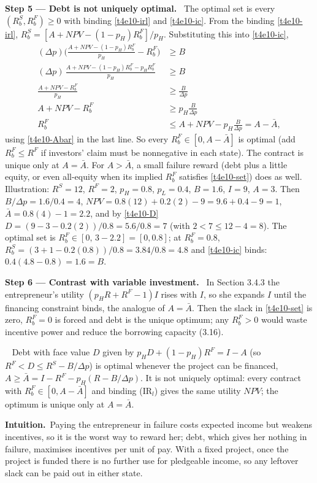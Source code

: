 \documentclass[11pt,a4paper]{article}
\newcommand{\step}[2]{\par\medskip\noindent\textbf{Step #1 --- #2.}~}
\newcommand{\intuition}{\par\medskip\noindent\textbf{Intuition.}~}
\newcommand{\answer}[1]{\par\smallskip\noindent\fbox{\textbf{Answer #1.}}~}
\begin{document}
\step{5}{Debt is not uniquely optimal} The optimal set is every $(R_b^S,R_b^F)\ge0$ with binding
\eqref{t4e10-irl} and \eqref{t4e10-ic}. From the binding \eqref{t4e10-irl},
$R_b^S=[A+\mathit{NPV}-(1-p_H)R_b^F]/p_H$. Substituting this into \eqref{t4e10-ic},
\begin{align}
  (\Delta p)\Big(\frac{A+\mathit{NPV}-(1-p_H)R_b^F}{p_H}-R_b^F\Big) &\ge B \nonumber\\
  (\Delta p)\,\frac{A+\mathit{NPV}-(1-p_H)R_b^F-p_HR_b^F}{p_H} &\ge B \nonumber\\
  \frac{A+\mathit{NPV}-R_b^F}{p_H} &\ge \frac{B}{\Delta p} \nonumber\\
  A+\mathit{NPV}-R_b^F &\ge p_H\frac{B}{\Delta p} \nonumber\\
  R_b^F &\le A+\mathit{NPV}-p_H\frac{B}{\Delta p}=A-\bar A, \label{t4e10-set}
\end{align}
using \eqref{t4e10-Abar} in the last line. So every $R_b^F\in[0,A-\bar A]$ is optimal (add
$R_b^F\le R^F$ if investors' claim must be nonnegative in each state). The contract is unique only
at $A=\bar A$. For $A>\bar A$, a small failure reward (debt plus a little equity, or even all-equity
when its implied $R_b^F$ satisfies \eqref{t4e10-set}) does as well. Illustration: $R^S=12$, $R^F=2$,
$p_H=0.8$, $p_L=0.4$, $B=1.6$, $I=9$, $A=3$. Then $B/\Delta p=1.6/0.4=4$,
$\mathit{NPV}=0.8(12)+0.2(2)-9=9.6+0.4-9=1$, $\bar A=0.8(4)-1=2.2$, and by \eqref{t4e10-D}
$D=(9-3-0.2(2))/0.8=5.6/0.8=7$ (with $2<7\le12-4=8$). The optimal set is
$R_b^F\in[0,\,3-2.2]=[0,0.8]$; at $R_b^F=0.8$, $R_b^S=(3+1-0.2(0.8))/0.8=3.84/0.8=4.8$ and
\eqref{t4e10-ic} binds: $0.4(4.8-0.8)=1.6=B$.

\step{6}{Contrast with variable investment} In Section 3.4.3 the entrepreneur's utility
$(p_HR+R^F-1)I$ rises with $I$, so she expands $I$ until the financing constraint binds, the
analogue of $A=\bar A$. Then the slack in \eqref{t4e10-set} is zero, $R_b^F=0$ is forced and debt is
the unique optimum; any $R_b^F>0$ would waste incentive power and reduce the borrowing capacity (3.16).

\answer{(3.18)} Debt with face value $D$ given by $p_HD+(1-p_H)R^F=I-A$ (so $R^F<D\le R^S-B/\Delta p$)
is optimal whenever the project can be financed, $A\ge\bar A=I-R^F-p_H(R-B/\Delta p)$. It is not
uniquely optimal: every contract with $R_b^F\in[0,A-\bar A]$ and binding (IR$_l$) gives the same
utility $\mathit{NPV}$; the optimum is unique only at $A=\bar A$.

\intuition Paying the entrepreneur in failure costs expected income but weakens incentives, so it is
the worst way to reward her; debt, which gives her nothing in failure, maximises incentives per unit
of pay. With a fixed project, once the project is funded there is no further use for pledgeable
income, so any leftover slack can be paid out in either state.
\end{document}
